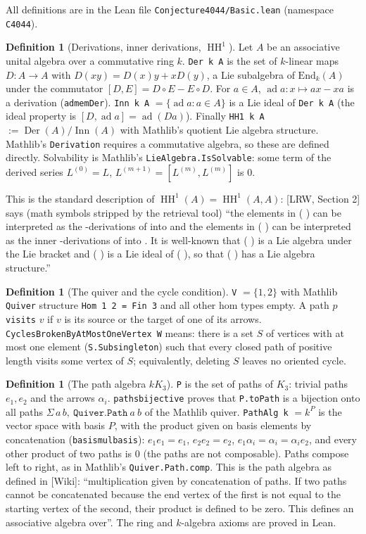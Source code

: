 \documentclass[11pt]{article}
\renewcommand{\_}{\oldus\allowbreak}
\theoremstyle{definition}
\newtheorem{definition}[theorem]{Definition}
\theoremstyle{remark}
\newcommand{\Der}{\operatorname{Der}}
\newcommand{\Inn}{\operatorname{Inn}}
\newcommand{\ad}{\operatorname{ad}}
\newcommand{\HH}{\operatorname{HH}}
\newcommand{\lean}[1]{\texttt{#1}}
\begin{document}
All definitions are in the Lean file \lean{Conjecture4044/Basic.lean} (namespace \lean{C4044}).

\begin{definition}[Derivations, inner derivations, $\HH^1$]
Let $A$ be an associative unital algebra over a commutative ring $k$.
\lean{Der k A} is the set of $k$-linear maps $D : A \to A$ with $D(xy) = D(x)y + xD(y)$, a Lie
subalgebra of $\mathrm{End}_k(A)$ under the commutator $[D,E] = D\circ E - E \circ D$.
For $a \in A$, $\ad a : x \mapsto ax - xa$ is a derivation (\lean{ad\_mem\_Der}).
\lean{Inn k A} $= \{\ad a : a \in A\}$ is a Lie ideal of \lean{Der k A} (the ideal property is
$[D, \ad a] = \ad(D a)$). Finally \lean{HH1 k A} $:= \Der(A)/\Inn(A)$ with Mathlib's quotient Lie
algebra structure.
Mathlib's \lean{Derivation} requires a commutative algebra, so these are defined directly.
Solvability is Mathlib's \lean{LieAlgebra.IsSolvable}: some term of the derived series
$L^{(0)} = L$, $L^{(m+1)} = [L^{(m)}, L^{(m)}]$ is $0$.
\end{definition}

This is the standard description of $\HH^1(A) = \HH^1(A,A)$: [LRW, Section 2] says (math symbols
stripped by the retrieval tool) ``the elements in ( ) can be interpreted as the -derivations of
into and the elements in ( ) can be interpreted as the inner -derivations of into . It is
well-known that ( ) is a Lie algebra under the Lie bracket and ( ) is a Lie ideal of ( ), so that
( ) has a Lie algebra structure.''

\begin{definition}[The quiver and the cycle condition]
\lean{V} $=\{1,2\}$ with Mathlib \lean{Quiver} structure \lean{Hom 1 2 = Fin 3} and all other hom
types empty. A path $p$ \lean{visits} $v$ if $v$ is its source or the target of one of its arrows.
\lean{CyclesBrokenByAtMostOneVertex W} means: there is a set $S$ of vertices with at most one
element (\lean{S.Subsingleton}) such that every closed path of positive length visits some
vertex of $S$; equivalently, deleting $S$ leaves no oriented cycle.
\end{definition}

\begin{definition}[The path algebra $kK_3$]
\lean{P} is the set of paths of $K_3$: trivial paths $e_1,e_2$ and the arrows $\alpha_i$.
\lean{paths\_bijective} proves that \lean{P.toPath} is a bijection onto all paths
$\Sigma\, a\, b,\ \lean{Quiver.Path}\ a\ b$ of the Mathlib quiver.
\lean{PathAlg k} $= k^{P}$ is the vector space with basis $P$, with the product given on basis
elements by concatenation (\lean{basis\_mul\_basis}): $e_1e_1 = e_1$, $e_2e_2=e_2$,
$e_1\alpha_i = \alpha_i = \alpha_i e_2$, and every other product of two paths is $0$ (the paths are
not composable). Paths compose left to right, as in Mathlib's \lean{Quiver.Path.comp}.
This is the path algebra as defined in [Wiki]: ``multiplication given by concatenation of paths.
If two paths cannot be concatenated because the end vertex of the first is not equal to the
starting vertex of the second, their product is defined to be zero. This defines an associative
algebra over''. The ring and $k$-algebra axioms are proved in Lean.
\end{definition}
\end{document}
